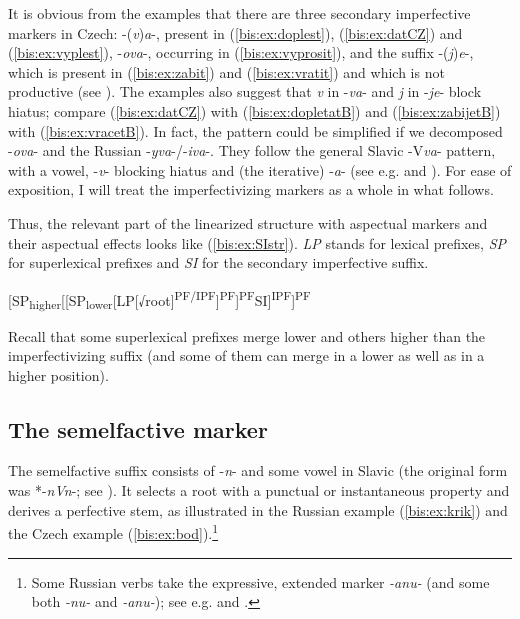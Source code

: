 \documentclass[output=paper]{langscibook}
\begin{document}
\noindent It is obvious from the examples that there are three secondary imperfective markers in Czech: -(\textit{v})\textit{a}-, present in (\ref{bis:ex:doplest}), (\ref{bis:ex:datCZ}) and (\ref{bis:ex:vyplest}), -\textit{ova}-, occurring in (\ref{bis:ex:vyprosit}), and the suffix -(\textit{j})\textit{e}-, which is present in (\ref{bis:ex:zabit}) and (\ref{bis:ex:vratit}) and which is not productive (see \citealt{Petr1986}). The examples also suggest that \textit{v} in -\textit{va}- and \textit{j} in -\textit{je}- block hiatus; compare (\ref{bis:ex:datCZ}) with (\ref{bis:ex:dopletatB}) and (\ref{bis:ex:zabijetB}) with (\ref{bis:ex:vracetB}). In fact, the pattern could be simplified if we decomposed -\textit{ova}- and the Russian -\textit{yva}-/-\textit{iva}-. They follow the general Slavic -V\textit{va}- pattern, with a vowel, -\textit{v}- blocking hiatus and (the iterative) -\textit{a}- (see e.g. \citealt{Kuznecov1953} and \citealt{Lunt2001}). For ease of exposition, I will treat the imperfectivizing markers as a whole in what follows.

Thus, the relevant part of the linearized structure with aspectual markers and their aspectual effects looks like (\ref{bis:ex:SIstr}). \textit{LP} stands for lexical prefixes, \textit{SP} for superlexical prefixes and \textit{SI} for the secondary imperfective suffix. 

\ea\label{bis:ex:SIstr}	
[SP\textsubscript{higher}[[SP\textsubscript{lower}[LP[√root]\textsuperscript{PF/IPF}]\textsuperscript{PF}]\textsuperscript{PF}SI]\textsuperscript{IPF}]\textsuperscript{PF} 
\z

\noindent Recall that some superlexical prefixes merge lower and others higher than the imperfectivizing suffix (and some of them can merge in a lower as well as in a higher position).

\subsection{The semelfactive marker}\label{bis:sec:seml}
The semelfactive suffix consists of -\textit{n}- and some vowel in Slavic (the original form was *-\textit{nVn}-; see \citealt{Wiemer.Serzant2017}). It selects a root with a punctual or instantaneous property and derives a perfective stem, as illustrated in the Russian example (\ref{bis:ex:krik}) and the Czech example (\ref{bis:ex:bod}).\footnote{Some Russian verbs take the expressive, extended marker \textit{-anu-} (and some both \textit{-nu-} and \textit{-anu-}); see e.g. \citet{Isacenko1962} and  \citet{Svedova1980}.}
\end{document}
